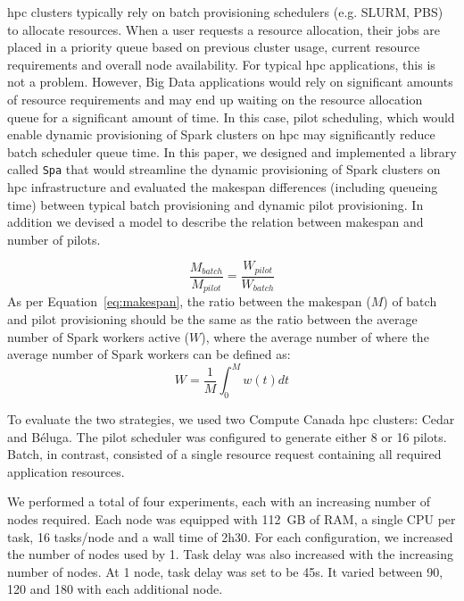\documentclass{report}
\begin{document}
        \gls{hpc} clusters typically rely on batch provisioning schedulers (e.g. SLURM, PBS)
        to allocate resources. When a user requests a resource allocation, their jobs
        are placed in a priority queue based on previous cluster usage, current resource
        requirements and overall node availability. For typical \gls{hpc} applications,
        this is not a problem. However, Big Data applications would rely on significant
        amounts of resource requirements and may end up waiting on the resource allocation
        queue for a significant amount of time. In this case, pilot scheduling, which
        would enable dynamic provisioning of Spark clusters on \gls{hpc} may significantly
        reduce batch scheduler queue time. In this paper, we designed and implemented
        a library called \texttt{Spa} that would streamline the dynamic provisioning of
        Spark clusters on \gls{hpc} infrastructure and evaluated the makespan differences
        (including queueing time) between typical batch provisioning and 
        dynamic pilot provisioning. In addition we devised a model to
        describe the relation between makespan and number of pilots.

        \begin{equation}\label{eq:makespan}                                                       
            \frac{M_{batch}}{M_{pilot}} = \frac{W_{pilot}}{W_{batch}}
        \end{equation} 
        As per Equation~\ref{eq:makespan}, the ratio between the makespan ($M$) of batch
        and pilot provisioning should be the same as the ratio between the average number
        of Spark workers active ($W$), where the average number of where the average number
        of Spark workers can be defined as:
        \begin{equation}\label{eq:avgw}
            W = \frac{1}{M}\int_0^M{w(t)dt}
        \end{equation}

        To evaluate the two strategies, we used two Compute Canada \gls{hpc} clusters: 
        Cedar and B\'eluga. The pilot scheduler was configured to generate either 8 or 16 pilots.
        Batch, in contrast, consisted of a single resource request containing all
        required application resources.

       We performed a total of four experiments, each with an increasing number of nodes required.
       Each node was equipped with 112~GB of RAM, a single CPU per task, 16 tasks/node
       and a wall time of 2h30. For each configuration, we increased the number
       of nodes used by 1. Task delay was also increased with the increasing number
       of nodes. At 1 node, task delay was set to be 45s. It varied
        between 90, 120 and 180 with each additional node.
\end{document}
